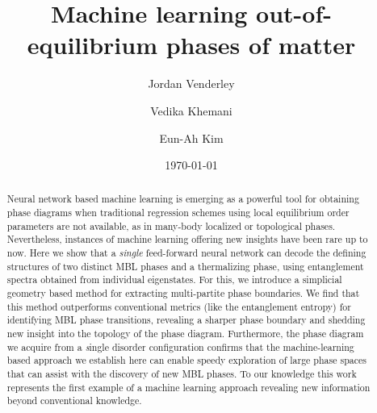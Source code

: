 \documentclass[amsmath,amssymb, aps, prb, superscriptaddress,twocolumn]{revtex4-1}
\begin{document}
\title{Machine learning out-of-equilibrium phases of matter}


\author{Jordan Venderley}

\author{Vedika Khemani}

\author{Eun-Ah Kim}



\date{\today}
\begin{abstract}

{Neural network based machine learning is emerging as a powerful tool for obtaining phase diagrams when traditional regression schemes using local equilibrium order parameters are not available, as in many-body localized or topological phases.  Nevertheless, instances of machine learning offering new insights have been rare up to now. Here we show that a \emph{single} feed-forward neural network can decode the defining structures of two distinct MBL phases and a thermalizing phase, using entanglement spectra obtained from individual eigenstates.
For this, we
introduce a simplicial geometry based method for extracting multi-partite phase boundaries. We find that this method outperforms conventional metrics (like the entanglement entropy) for identifying MBL phase transitions, revealing a sharper phase boundary and shedding new insight into the topology of the phase diagram. Furthermore, the phase diagram we acquire from a {\emph single} disorder configuration confirms that the machine-learning based approach we establish here can enable speedy exploration of large phase spaces that can assist with the discovery of new MBL phases. To our knowledge this work represents the first example of a machine learning approach revealing new information beyond conventional knowledge.}

\end{abstract}
\maketitle
\end{document}
